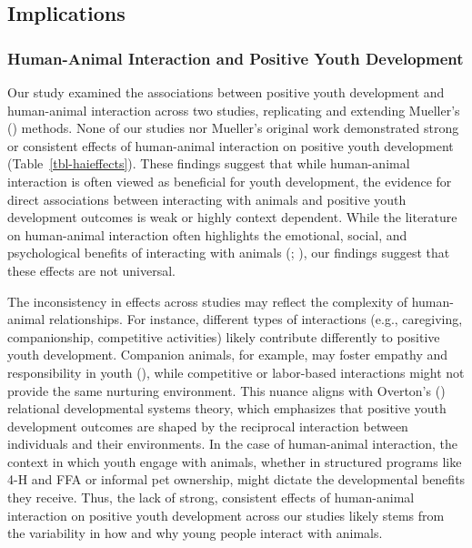 \documentclass[
  jou,
  longtable,
  nolmodern,
  notxfonts,
  notimes,
  colorlinks=true,linkcolor=blue,citecolor=blue,urlcolor=blue]{apa7}
\begin{document}
\subsection{Implications}\label{implications}

\subsubsection{Human-Animal Interaction and Positive Youth
Development}\label{human-animal-interaction-and-positive-youth-development}

Our study examined the associations between positive youth development
and human-animal interaction across two studies, replicating and
extending Mueller's () methods. None of
our studies nor Mueller's original work demonstrated strong or
consistent effects of human-animal interaction on positive youth
development (Table~\ref{tbl-haieffects}). These findings suggest that
while human-animal interaction is often viewed as beneficial for youth
development, the evidence for direct associations between interacting
with animals and positive youth development outcomes is weak or highly
context dependent. While the literature on human-animal interaction
often highlights the emotional, social, and psychological benefits of
interacting with animals (; ), our findings suggest
that these effects are not universal.

The inconsistency in effects across studies may reflect the complexity
of human-animal relationships. For instance, different types of
interactions (e.g., caregiving, companionship, competitive activities)
likely contribute differently to positive youth development. Companion
animals, for example, may foster empathy and responsibility in youth
(), while
competitive or labor-based interactions might not provide the same
nurturing environment. This nuance aligns with Overton's
() relational developmental systems
theory, which emphasizes that positive youth development outcomes are
shaped by the reciprocal interaction between individuals and their
environments. In the case of human-animal interaction, the context in
which youth engage with animals, whether in structured programs like 4-H
and FFA or informal pet ownership, might dictate the developmental
benefits they receive. Thus, the lack of strong, consistent effects of
human-animal interaction on positive youth development across our
studies likely stems from the variability in how and why young people
interact with animals.
\end{document}
